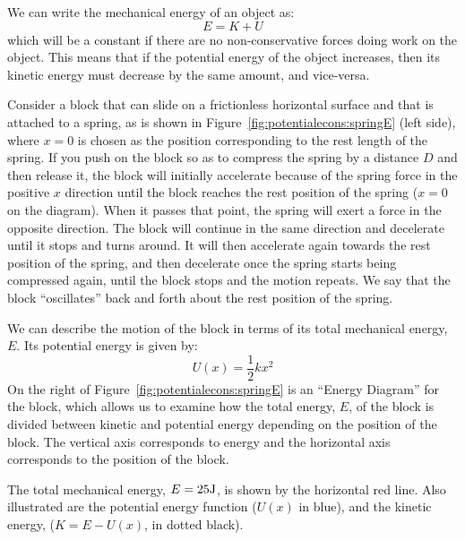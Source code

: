 We can write the mechanical energy of an object as:
\begin{equation}
E = K + U
\end{equation}
which will be a constant if there are no non-conservative forces doing work on the object. This means that if the potential energy of the object increases, then its kinetic energy must decrease by the same amount, and vice-versa.

Consider a block that can slide on a frictionless horizontal surface and that is attached to a spring, as is shown in Figure~\ref{fig:potentialecons:springE} (left side), where $x=0$ is chosen as the position corresponding to the rest length of the spring. If you push on the block so as to compress the spring by a distance $D$ and then release it, the block will initially accelerate because of the spring force in the positive $x$ direction until the block reaches the rest position of the spring ($x=0$ on the diagram). When it passes that point, the spring will exert a force in the opposite direction. The block will continue in the same direction and decelerate until it stops and turns around. It will then accelerate again towards the rest position of the spring, and then decelerate once the spring starts being compressed again, until the block stops and the motion repeats. We say that the block ``oscillates'' back and forth about the rest position of the spring.

We can describe the motion of the block in terms of its total mechanical energy, $E$. Its potential energy is given by:
\begin{equation}
U(x)=\frac{1}{2}kx^2
\end{equation}
On the right of Figure~\ref{fig:potentialecons:springE} is an ``Energy Diagram'' for the block, which allows us to examine how the total energy, $E$, of the block is divided between kinetic and potential energy depending on the position of the block. The vertical axis corresponds to energy and the horizontal axis corresponds to the position of the block.

The total mechanical energy, $E=25 {\rm J}$, is shown by the horizontal red line. Also illustrated are the potential energy function ($U(x)$ in blue), and the kinetic energy, ($K=E -U(x)$, in dotted black).

